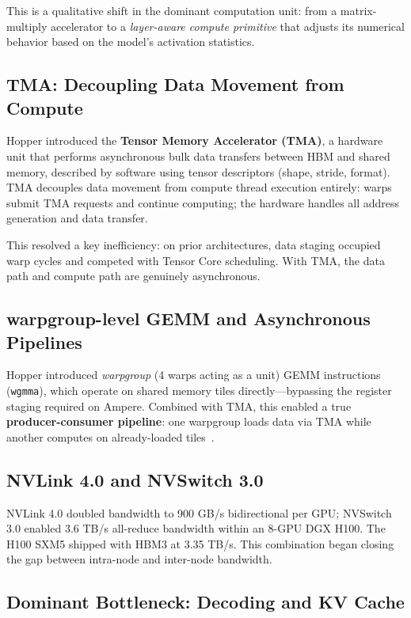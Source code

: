 \documentclass[10pt,twocolumn]{article}
\begin{document}
This is a qualitative shift in the dominant computation unit: from a matrix-multiply accelerator to a \textit{layer-aware compute primitive} that adjusts its numerical behavior based on the model's activation statistics.

\subsection{TMA: Decoupling Data Movement from Compute}

Hopper introduced the \textbf{Tensor Memory Accelerator (TMA)}, a hardware unit that performs asynchronous bulk data transfers between HBM and shared memory, described by software using tensor descriptors (shape, stride, format). TMA decouples data movement from compute thread execution entirely: warps submit TMA requests and continue computing; the hardware handles all address generation and data transfer.

This resolved a key inefficiency: on prior architectures, data staging occupied warp cycles and competed with Tensor Core scheduling. With TMA, the data path and compute path are genuinely asynchronous.

\subsection{warpgroup-level GEMM and Asynchronous Pipelines}

Hopper introduced \textit{warpgroup} (4 warps acting as a unit) GEMM instructions (\texttt{wgmma}), which operate on shared memory tiles directly—bypassing the register staging required on Ampere. Combined with TMA, this enabled a true \textbf{producer-consumer pipeline}: one warpgroup loads data via TMA while another computes on already-loaded tiles~\citep{nvidia2022hopper}.

\subsection{NVLink 4.0 and NVSwitch 3.0}

NVLink 4.0 doubled bandwidth to 900 GB/s bidirectional per GPU; NVSwitch 3.0 enabled 3.6 TB/s all-reduce bandwidth within an 8-GPU DGX H100. The H100 SXM5 shipped with HBM3 at 3.35 TB/s. This combination began closing the gap between intra-node and inter-node bandwidth.

\subsection{Dominant Bottleneck: Decoding and KV Cache}
\end{document}
